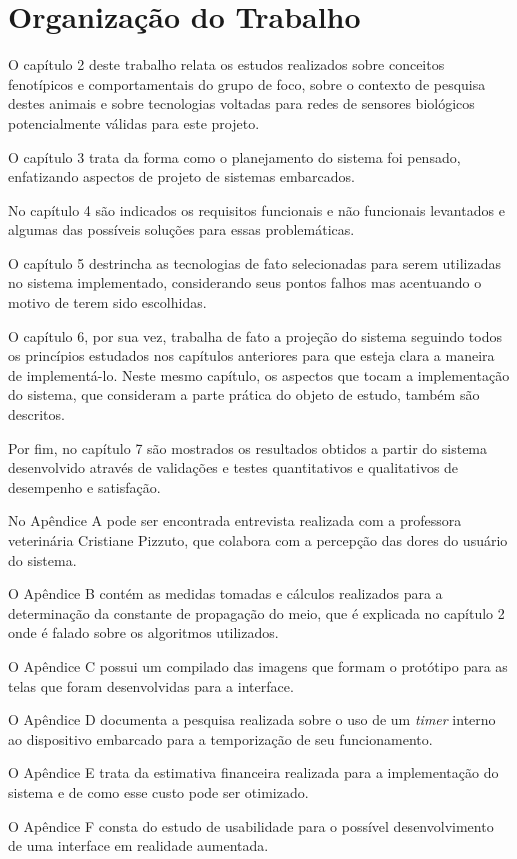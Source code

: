 \section{Organização do Trabalho}
O capítulo 2 deste trabalho relata os estudos realizados sobre conceitos fenotípicos e comportamentais do grupo de foco, sobre o contexto de pesquisa destes animais e sobre tecnologias voltadas para redes de sensores biológicos potencialmente válidas para este projeto.

O capítulo 3 trata da forma como o planejamento do sistema foi pensado, enfatizando aspectos de projeto de sistemas embarcados.

No capítulo 4 são indicados os requisitos funcionais e não funcionais levantados e algumas das possíveis soluções para essas problemáticas.

O capítulo 5 destrincha as tecnologias de fato selecionadas para serem utilizadas no sistema implementado, considerando seus pontos falhos mas acentuando o motivo de terem sido escolhidas.

O capítulo 6, por sua vez, trabalha de fato a projeção do sistema seguindo todos os princípios estudados nos capítulos anteriores para que esteja clara a maneira de implementá-lo. Neste mesmo capítulo, os aspectos que tocam a implementação do sistema, que consideram a parte prática do objeto de estudo, também são descritos.

Por fim, no capítulo 7 são mostrados os resultados obtidos a partir do sistema desenvolvido através de validações e testes quantitativos e qualitativos de desempenho e satisfação.

No Apêndice A pode ser encontrada entrevista realizada com a professora veterinária Cristiane Pizzuto, que colabora com a percepção das dores do usuário do sistema.

O Apêndice B contém as medidas tomadas e cálculos realizados para a determinação da constante de propagação do meio, que é explicada no capítulo 2 onde é falado sobre os algoritmos utilizados.

O Apêndice C possui um compilado das imagens que formam o protótipo para as telas que foram desenvolvidas para a interface.

O Apêndice D documenta a pesquisa realizada sobre o uso de um \emph{timer} interno ao dispositivo embarcado para a temporização de seu funcionamento.

O Apêndice E trata da estimativa financeira realizada para a implementação do sistema e de como esse custo pode ser otimizado.

O Apêndice F consta do estudo de usabilidade para o possível desenvolvimento de uma interface em realidade aumentada.
